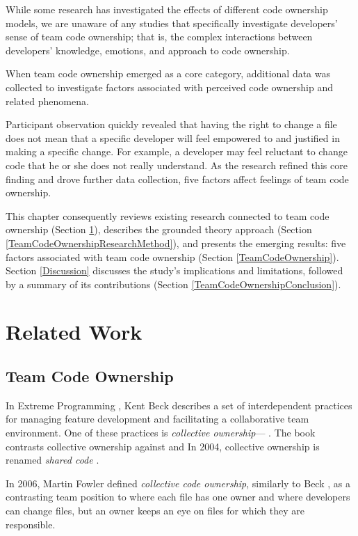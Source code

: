 While some research has investigated the effects of different code ownership models, we are unaware of any studies that specifically investigate developers' sense of team code ownership; that is, the complex interactions between developers' knowledge, emotions, and approach to code ownership.  

When team code ownership emerged as a core category, additional data was collected to investigate factors associated with perceived code ownership and related phenomena. 

Participant observation quickly revealed that having the right to change a file does not mean that a specific developer will feel empowered to and justified in making a specific change. For example, a developer may feel reluctant to change code that he or she does not really understand. As the research refined this core finding and drove further data collection, five factors affect feelings of team code ownership. 

This chapter consequently reviews existing research connected to team code ownership (Section \ref{TeamCodeOwnnershipRelatedWork}), describes the grounded theory approach (Section \ref{TeamCodeOwnershipResearchMethod}), and presents the emerging results: five factors associated with team code ownership (Section \ref{TeamCodeOwnership}). Section \ref{Discussion} discusses the study's implications and limitations, followed by a summary of its contributions (Section \ref{TeamCodeOwnershipConclusion}).
\section{Related Work}
\label{TeamCodeOwnnershipRelatedWork}

\subsection{Team Code Ownership}
In Extreme Programming \cite{BeckExtremeProgramming2004}, Kent Beck describes a set of interdependent practices for managing feature development and facilitating a collaborative team environment. One of these practices is \textit{collective ownership}--- \cite{BeckExtremeProgramming2000}. The book contrasts collective ownership against  and  In 2004, collective ownership is renamed \textit{shared code} \cite{BeckExtremeProgramming2004}.

In 2006, Martin Fowler defined \textit{collective code ownership}, similarly to Beck \cite{FowlerCodeOwnership}, as a contrasting team position to  where each file has one owner and  where developers can change files, but an owner keeps an eye on files for which they are responsible. 

